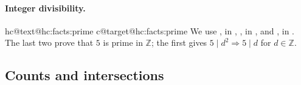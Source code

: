 \documentclass[11pt]{amsart}
\makeatletter
\newcommand\ints{{\mathbb Z}}
\let\hcSavedLabel\label
\renewcommand{\label}[1]{%
  \hcSavedLabel{#1}%
  \expandafter\protected@xdef\csname hc@text@#1\endcsname{\@currentlabel}%
  \expandafter\xdef\csname hc@target@#1\endcsname{\@currentHref}}
\makeatother
\begin{document}
\paragraph{Integer divisibility.}\makeatletter{}\makeatother\label{hc:facts:prime}
\uses{}
We use , in ,
, in ,
and , in .
The last two prove that $5$ is prime in $\ints$; the first gives
$5\mid d^2\Rightarrow5\mid d$ for $d\in\ints$.

\par\endgroup

\subsection{Counts and intersections}
\end{document}
